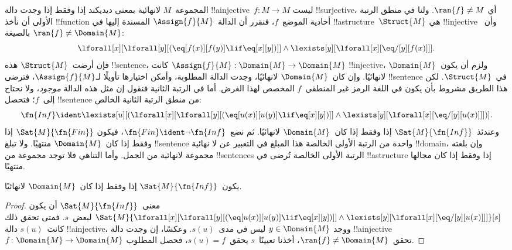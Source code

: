 \documentclass[../../../include/open-logic-section]{subfiles}
\begin{document}


المجموعة~$M$ لانهائية بمعنى ديديكند إذا وفقط إذا وجدت دالة
!!a{injective}~$f\colon M \to M$ ليست !!{surjective}، أي
$\ran{f} \neq M$. ولنا في منطق الرتبة الأولى أن نأخذ
!!{function} أحادية الموضع~$f$، فنقرر أن الدالة~$\Assign{f}{M}$
المسندة إليها في !!a{structure}~$\Struct{M}$ هي !!{injective}
وأن~$\ran{f} \neq \Domain{M}$ بالصيغة:
\[
\lforall[x][\lforall[y][(\eq[f(x)][f(y)] \lif \eq[x][y])]] \land
\lexists[y][\lforall[x][\eq/[y][f(x)]]].
\]
فإن أرضت~$\Struct{M}$ هذه !!{sentence}، كانت
$\Assign{f}{M}: \Domain{M} \to \Domain{M}$ !!{injective}،
ولزم أن يكون~$\Domain{M}$ لانهائيًا. وإن كان~$\Domain{M}$
لانهائيًا، وجدت الدالة المطلوبة، وأمكن اختيارها تأويلًا
لـ$\Assign{f}{M}$، فترضى !!{sentence} في~$\Struct{M}$.
لكن هذا الطريق مشروط بأن يكون في اللغة الرمز غير المنطقي~$f$
المخصص لهذا الغرض. أما في الرتبة الثانية فنقول إن مثل هذه الدالة
\emph{موجود}، ولا نحتاج إلى~$f$؛ فتحصل !!{sentence} من منطق
الرتبة الثانية الخالص:
\[
\fn{Inf} \ident \lexists[u][(\lforall[x][\lforall[y][(\eq[u(x)][u(y)]
      \lif \eq[x][y])]] \land \lexists[y][\lforall[x][\eq/[y][u(x)]]])].
\]
وعندئذ~$\Sat{M}{\fn{Inf}}$ إذا وفقط إذا كان~$\Domain{M}$ لانهائيًا.
ثم نضع~$\fn{Fin} \ident \lnot \fn{Inf}$، فيكون
$\Sat{M}{\fn{Fin}}$ إذا وفقط إذا كان~$\Domain{M}$ منتهيًا.
ولا تبلغ !!{sentence} واحدة من الرتبة الأولى الخالصة هذا المبلغ
في التعبير عن لا نهائية !!{domain}، وإن بلغته مجموعة لانهائية
من الجمل. وأما التناهي فلا توجد مجموعة من !!{sentence}s
الرتبة الأولى الخالصة تُرضى في !!a{structure} إذا وفقط إذا
كان مجالها منتهيًا.

\begin{prop}
يكون~$\Sat{M}{\fn{Inf}}$ إذا وفقط إذا كان~$\Domain{M}$ لانهائيًا.
\end{prop}

\begin{proof}
معنى~$\Sat{M}{\fn{Inf}}$ أن يكون
  $\Sat{M}{\lforall[x][\lforall[y][(\eq[u(x)][u(y)] \lif \eq[x][y])]]
    \land \lexists[y][\lforall[x][\eq/[y][u(x)]]]}[s]$
  لبعض~$s$.
فمتى تحقق ذلك كانت~$s(u)$ دالة !!a{injective}، ووجد
$y \in \Domain{M}$ ليس في مدى~$s(u)$.
وعكسًا، إن وجدت دالة !!a{injective}~$f\colon \Domain{M} \to \Domain{M}$
تحقق~$\ran{f} \neq \Domain{M}$، أخذنا تعيينًا~$s$
يحقق~$s(u) = f$، فحصل المطلوب.
\end{proof}
\end{document}

